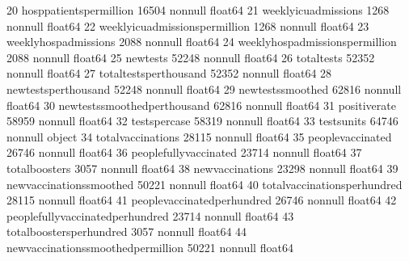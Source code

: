 \documentclass[letterpaper,10pt,english]{jupyterBook}
\begin{document}
\begin{sphinxVerbatim}[commandchars=\\\{\}]
 20  hosp\PYGZus{}patients\PYGZus{}per\PYGZus{}million                16504 non\PYGZhy{}null   float64       
 21  weekly\PYGZus{}icu\PYGZus{}admissions                    1268 non\PYGZhy{}null    float64       
 22  weekly\PYGZus{}icu\PYGZus{}admissions\PYGZus{}per\PYGZus{}million        1268 non\PYGZhy{}null    float64       
 23  weekly\PYGZus{}hosp\PYGZus{}admissions                   2088 non\PYGZhy{}null    float64       
 24  weekly\PYGZus{}hosp\PYGZus{}admissions\PYGZus{}per\PYGZus{}million       2088 non\PYGZhy{}null    float64       
 25  new\PYGZus{}tests                                52248 non\PYGZhy{}null   float64       
 26  total\PYGZus{}tests                              52352 non\PYGZhy{}null   float64       
 27  total\PYGZus{}tests\PYGZus{}per\PYGZus{}thousand                 52352 non\PYGZhy{}null   float64       
 28  new\PYGZus{}tests\PYGZus{}per\PYGZus{}thousand                   52248 non\PYGZhy{}null   float64       
 29  new\PYGZus{}tests\PYGZus{}smoothed                       62816 non\PYGZhy{}null   float64       
 30  new\PYGZus{}tests\PYGZus{}smoothed\PYGZus{}per\PYGZus{}thousand          62816 non\PYGZhy{}null   float64       
 31  positive\PYGZus{}rate                            58959 non\PYGZhy{}null   float64       
 32  tests\PYGZus{}per\PYGZus{}case                           58319 non\PYGZhy{}null   float64       
 33  tests\PYGZus{}units                              64746 non\PYGZhy{}null   object        
 34  total\PYGZus{}vaccinations                       28115 non\PYGZhy{}null   float64       
 35  people\PYGZus{}vaccinated                        26746 non\PYGZhy{}null   float64       
 36  people\PYGZus{}fully\PYGZus{}vaccinated                  23714 non\PYGZhy{}null   float64       
 37  total\PYGZus{}boosters                           3057 non\PYGZhy{}null    float64       
 38  new\PYGZus{}vaccinations                         23298 non\PYGZhy{}null   float64       
 39  new\PYGZus{}vaccinations\PYGZus{}smoothed                50221 non\PYGZhy{}null   float64       
 40  total\PYGZus{}vaccinations\PYGZus{}per\PYGZus{}hundred           28115 non\PYGZhy{}null   float64       
 41  people\PYGZus{}vaccinated\PYGZus{}per\PYGZus{}hundred            26746 non\PYGZhy{}null   float64       
 42  people\PYGZus{}fully\PYGZus{}vaccinated\PYGZus{}per\PYGZus{}hundred      23714 non\PYGZhy{}null   float64       
 43  total\PYGZus{}boosters\PYGZus{}per\PYGZus{}hundred               3057 non\PYGZhy{}null    float64       
 44  new\PYGZus{}vaccinations\PYGZus{}smoothed\PYGZus{}per\PYGZus{}million    50221 non\PYGZhy{}null   float64       

\end{sphinxVerbatim}
\end{document}
